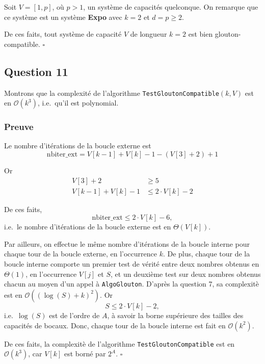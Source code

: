 \documentclass[12pt,a4paper]{article}
\newcommand{\BigO}{\mathcal{O}}
\begin{document}
 Soit $V = [1, p]$, o\`u $p > 1$, un syst\`eme de capacit\'es quelconque. On remarque que ce syst\`eme est un syst\`eme {\bfseries Expo} avec $k = 2$ et $d = p \geq 2$.

 De ces faits, tout syst\`eme de capacit\'e $V$ de longueur $k = 2$ est bien glouton-compatible. \hfill\ensuremath{\square}
 
 \subsection*{Question 11}
 Montrons que la complexit\'e de l'algorithme \texttt{TestGloutonCompatible}$(k, V)$ est en $\BigO(k^3)$, i.e.\ qu'il est polynomial.

 \subsubsection*{Preuve}
 Le nombre d'it\'erations de la boucle externe est  
 \begin{equation*}
    \text{nbiter\_ext} = V[k-1]+V[k]-1 -(V[3]+2) +1
 \end{equation*}
 
 Or 
 \begin{align*}
 V[3]+2 &\geq 5 \\
 V[k-1]+V[k]-1 &\leq 2\cdot V[k] - 2 
\end{align*}
 
 De ces faits, 
 \begin{equation*}
    \text{nbiter\_ext} \leq 2\cdot V[k] - 6,
 \end{equation*}
 i.e.\ le nombre d'it\'erations de la boucle externe est en $\Theta(V[k])$.
 
 Par ailleurs, on effectue le m\^eme nombre d'it\'erations de la boucle interne pour chaque tour de la boucle externe, en l'occurrence $k$. De plus, chaque tour de la boucle interne comporte un premier test de v\'erit\'e entre deux nombres obtenus en $\Theta(1)$, en l'occurrence $V[j]$ et $S$, et un deuxi\`eme test sur deux nombres obtenus chacun au moyen d'un appel \`a \texttt{AlgoGlouton}. 
 D'apr\`es la question 7, sa complexit\`e est en $\BigO((\log(S) + k)^2)$. 
 Or 
 \begin{equation*}
  S \leq 2\cdot V[k] - 2,
 \end{equation*}
 i.e.\ $\log(S)$ est de l'ordre de $A$, \`a savoir la borne sup\'erieure des tailles des capacit\'es de bocaux.
 Donc, chaque tour de la boucle interne est fait en $\BigO(k^2)$.
 
 De ces faits, la complexit\`e de l'algorithme \texttt{TestGloutonCompatible} est en $\BigO(k^3)$, car $V[k]$ est born\'e par $2^A$. \hfill\ensuremath{\square}
 
\end{document}
